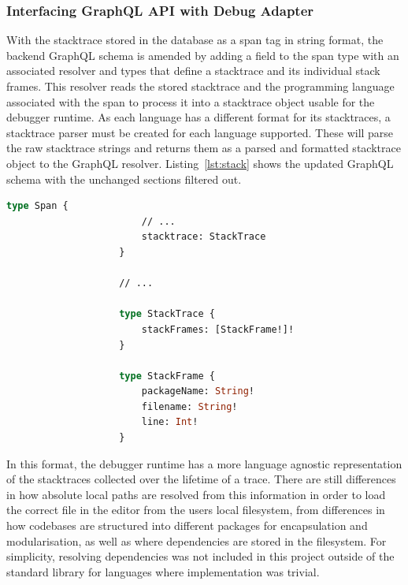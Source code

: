 \documentclass[12pt,pdftex,titlepage]{report}
\begin{document}
                \subsubsection{Interfacing GraphQL API with Debug Adapter}
                    With the stacktrace stored in the database as a span tag in string format, the backend GraphQL schema is amended by adding a field to the span type with an associated resolver and 
                    types that define a stacktrace and its individual stack frames. This resolver reads the stored stacktrace and the programming language associated with the span to process it into a 
                    stacktrace object usable for the debugger runtime. As each language has a different format for its stacktraces, a stacktrace parser must be created for each language supported. These
                    will parse the raw stacktrace strings and returns them as a parsed and formatted stacktrace object to the GraphQL resolver. Listing~\ref{lst:stack} shows the updated GraphQL schema
                    with the unchanged sections filtered out. 

                \bigskip
                \begin{lstlisting}[caption={GraphQL schema updated with stack- trace and frame objects, unchanged fields and objects filtered.}, language=GraphQL, gobble=20, label={lst:stack}]
                    type Span {
                        // ...
                        stacktrace: StackTrace
                    }

                    // ...

                    type StackTrace {
                        stackFrames: [StackFrame!]!
                    }

                    type StackFrame {
                        packageName: String!
                        filename: String!
                        line: Int!
                    }
                \end{lstlisting}
                \bigskip

                In this format, the debugger runtime has a more language agnostic representation of the stacktraces collected over the lifetime of a trace. There are still differences
                in how absolute local paths are resolved from this information in order to load the correct file in the editor from the users local filesystem, from differences in how
                codebases are structured into different packages for encapsulation and modularisation, as well as where dependencies are stored in the filesystem. For simplicity, 
                resolving dependencies was not included in this project outside of the standard library for languages where implementation was trivial.
\end{document}
